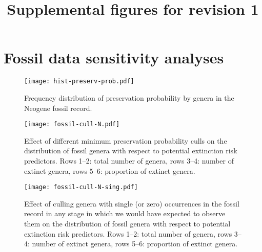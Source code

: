 \documentclass[11pt]{article}
\title{Supplemental figures for revision 1}
\author{}
\begin{document}
\maketitle

\section{Fossil data sensitivity analyses}

\begin{figure}[htbp]
\begin{center}
\texttt{[image: hist-preserv-prob.pdf]}
\caption{Frequency distribution of preservation probability by genera in the Neogene fossil record.}
\label{fig:hist-preserv-prob}
\end{center}
\end{figure}

\clearpage

\begin{figure}[htbp]
\begin{center}
\texttt{[image: fossil-cull-N.pdf]}
\caption{Effect of different minimum preservation probability culls on the distribution of fossil genera with respect to potential extinction risk predictors. Rows 1--2: total number of genera, rows 3--4: number of extinct genera, rows 5--6: proportion of extinct genera.}
\end{center}
\end{figure}

\clearpage

\begin{figure}[htbp]
\begin{center}
\texttt{[image: fossil-cull-N-sing.pdf]}
\caption{Effect of culling genera with single (or zero) occurrences in the fossil record in any stage in which we would have expected to observe them on the distribution of fossil genera with respect to potential extinction risk predictors. Rows 1--2: total number of genera, rows 3--4: number of extinct genera, rows 5--6: proportion of extinct genera.}
\end{center}
\end{figure}

\clearpage

\end{document}
